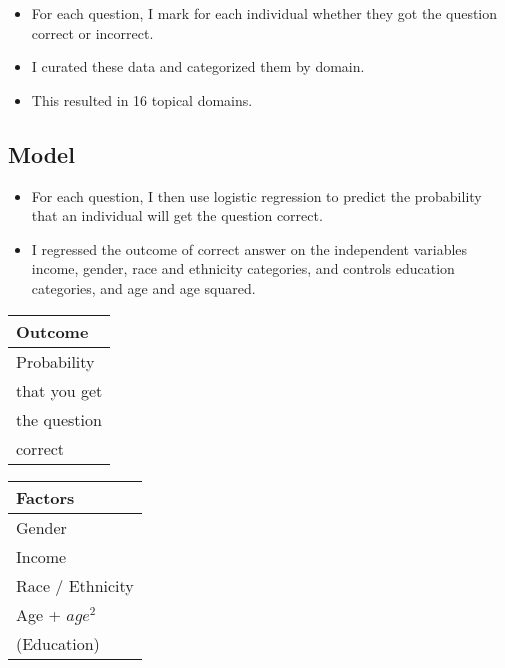 \documentclass[]{article}
\begin{document}
\begin{itemize}
  \item{For each question, I mark for each individual whether they got the question correct or incorrect.}
  \item{I curated these data and categorized them by domain.}
  \item{This resulted in 16 topical domains.}
\end{itemize}

\subsection{Model}
\begin{itemize}
  \item{For each question, I then use logistic regression to predict the probability that an individual will get the question correct.}
  \item{I regressed the outcome of correct answer on the independent variables income, gender, race and ethnicity categories, and controls education categories, and age and age squared.}
\end{itemize}

\begin{table}[ht]
\centering
     \begin{tabular}{l}  %
       \hline   %
       Outcome        \\
       \hline   %
       Probability      \\
       that you get     \\
       the question     \\
       correct          \\
       \hline  %
     \end{tabular}
     \begin{tabular}{l}  %
       \hline   %
       Factors          \\
       \hline   %
       Gender           \\
       Income           \\
       Race / Ethnicity \\
       Age + $age^2$    \\
       (Education)        \\
       \hline  %
      \end{tabular}
\end{table}
\end{document}

